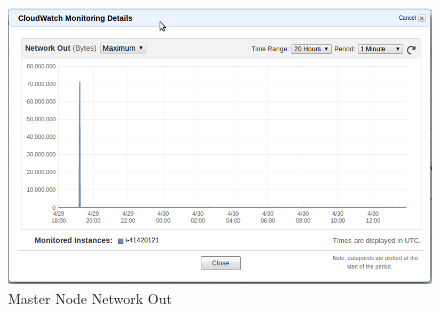 \begin{figure}[!htb]
  \includegraphics[width=\linewidth]{pics/master_network_out.png}
  \caption{Master Node Network Out}\label{fig:master_out}
\endminipage\hfill
\end{figure}

